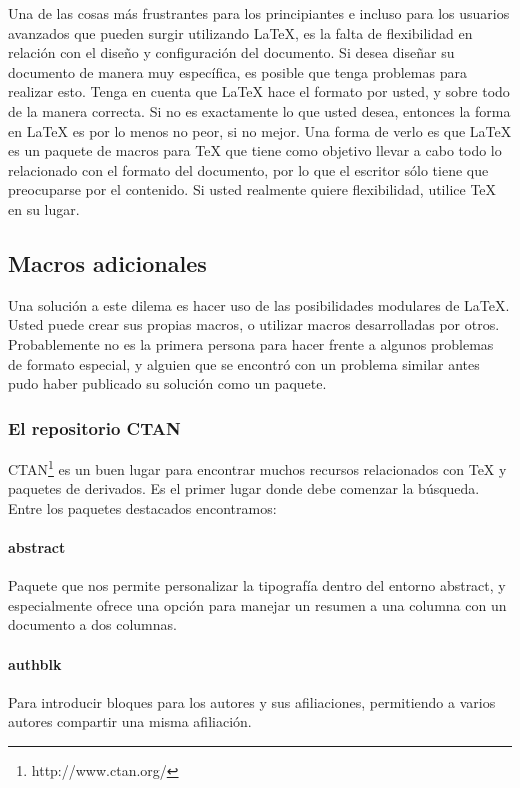 \documentclass[12pt,letterpaper]{article}
\begin{document}
Una de las cosas más frustrantes para los principiantes e incluso para los usuarios avanzados que pueden surgir utilizando \LaTeX, es la falta de flexibilidad en relación con el diseño y configuración del documento. Si desea diseñar su documento\cite{Pan} de manera muy específica, es posible que tenga problemas para realizar esto. Tenga en cuenta que LaTeX hace el formato por usted, y sobre todo de la manera correcta. Si no es exactamente lo que usted desea, entonces la forma en LaTeX es por lo menos no peor, si no mejor. Una forma de verlo es que LaTeX es un paquete de macros para TeX que tiene como objetivo llevar a cabo todo lo relacionado con el formato del documento, por lo que el escritor sólo tiene que preocuparse por el contenido. Si usted realmente quiere flexibilidad, utilice TeX en su lugar.

\subsection{Macros adicionales}

Una solución a este dilema es hacer uso de las posibilidades modulares de LaTeX. Usted puede crear sus propias macros, o utilizar macros desarrolladas por otros. Probablemente no es la primera persona para hacer frente a algunos problemas de formato especial, y alguien que se encontró con un problema similar antes pudo haber publicado su solución como un paquete.

\subsubsection{El repositorio CTAN}

CTAN\footnote{http://www.ctan.org/} es un buen lugar para encontrar muchos recursos relacionados con TeX y paquetes de derivados. Es el primer lugar donde debe comenzar la búsqueda. Entre los paquetes destacados encontramos:

\paragraph{abstract} Paquete que nos permite personalizar la tipografía dentro del entorno abstract, y especialmente ofrece una opción para manejar un resumen a una columna con un documento a dos columnas.

\paragraph{authblk} Para introducir bloques para los autores y sus afiliaciones, permitiendo a varios autores compartir una misma afiliación.
\end{document}
